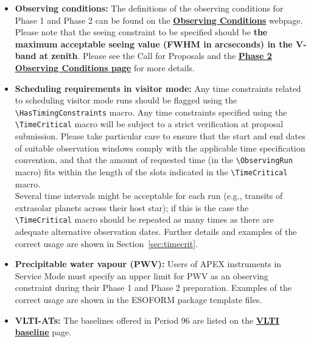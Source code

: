 \documentclass{article}
\begin{document}
\begin{itemize}
\item{\bf Observing conditions:} The definitions of the observing conditions for Phase 1 and Phase 2
can be found on the  \href{http://www.eso.org/sci/observing/phase2/ObsConditions.html}{\bf \underline{Observing Conditions}} webpage.
Please note that the seeing constraint to be specified should be 
{\bf the maximum acceptable seeing value (FWHM in arcseconds) in the V-band at zenith}.
Please see the Call for Proposals and the 
\href{http://www.eso.org/sci/observing/phase2/ObsConditions.html}{\bf\underline{Phase 2 Observing Conditions page}}
for more details.


\item{\bf Scheduling requirements in visitor mode: }
Any time constraints related to scheduling visitor mode runs should be flagged
using the \verb|\HasTimingConstraints| macro.
Any time constraints specified using the \verb|\TimeCritical| macro 
will be subject to a strict verification  at proposal submission. Please take
particular care to ensure
that the start and end dates of suitable observation windows comply
with the applicable time specification convention, and that the
amount of requested time (in the \verb|\ObservingRun| macro) fits
within the length of the slots indicated in the
\verb|\TimeCritical| macro.  \\
Several time intervals might be acceptable for each run 
(e.g., transits of extrasolar planets
across their host star); if this is the case the \verb|\TimeCritical| macro should be 
repeated as many   times as there are adequate alternative observation dates.
Further details and examples of the
correct usage are shown in Section~\ref{sec:timecrit}. 

\item \textbf{Precipitable water vapour (PWV):} Users of
APEX instruments in Service Mode must specify an upper limit for PWV
  as an observing constraint during their Phase 1 and Phase 2
  preparation. Examples of the correct usage are shown in the ESOFORM package 
  template files.

 \item{\bf VLTI-ATs:} The baselines offered in Period 96 are listed on the
\href{http://www.eso.org/sci/facilities/paranal/telescopes/vlti/configuration/index.html}
{\bf\underline{VLTI baseline}} page.

\end{itemize}

\end{document}

